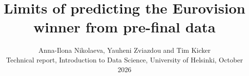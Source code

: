 \documentclass[a4paper,10pt]{article}
\title{\vspace{-1.2cm}\textbf{Limits of predicting the Eurovision winner from pre-final data}}
\author{Anna-Ilona Nikolaeva, Yauheni Zviazdou and Tim Kicker\\
\small Technical report, Introduction to Data Science, University of Helsinki, October 2026}
\date{}
\begin{document}
\maketitle
\vspace{-1.4em}

\begin{abstract}\small
\noindent

\end{abstract}



{\footnotesize
\setlength{\bibsep}{1pt}


}


\end{document}

